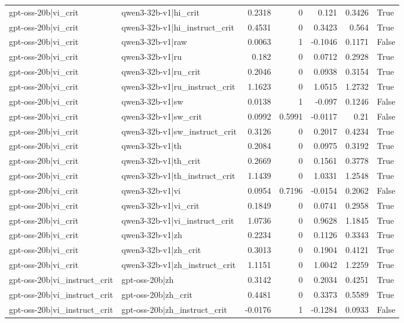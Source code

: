 \begin{table}
\begin{tabular}{l l r r r r l}
gpt-oss-20b|vi_crit & qwen3-32b-v1|hi_crit & 0.2318 & 0 & 0.121 & 0.3426 & True \\
gpt-oss-20b|vi_crit & qwen3-32b-v1|hi_instruct_crit & 0.4531 & 0 & 0.3423 & 0.564 & True \\
gpt-oss-20b|vi_crit & qwen3-32b-v1|raw & 0.0063 & 1 & -0.1046 & 0.1171 & False \\
gpt-oss-20b|vi_crit & qwen3-32b-v1|ru & 0.182 & 0 & 0.0712 & 0.2928 & True \\
gpt-oss-20b|vi_crit & qwen3-32b-v1|ru_crit & 0.2046 & 0 & 0.0938 & 0.3154 & True \\
gpt-oss-20b|vi_crit & qwen3-32b-v1|ru_instruct_crit & 1.1623 & 0 & 1.0515 & 1.2732 & True \\
gpt-oss-20b|vi_crit & qwen3-32b-v1|sw & 0.0138 & 1 & -0.097 & 0.1246 & False \\
gpt-oss-20b|vi_crit & qwen3-32b-v1|sw_crit & 0.0992 & 0.5991 & -0.0117 & 0.21 & False \\
gpt-oss-20b|vi_crit & qwen3-32b-v1|sw_instruct_crit & 0.3126 & 0 & 0.2017 & 0.4234 & True \\
gpt-oss-20b|vi_crit & qwen3-32b-v1|th & 0.2084 & 0 & 0.0975 & 0.3192 & True \\
gpt-oss-20b|vi_crit & qwen3-32b-v1|th_crit & 0.2669 & 0 & 0.1561 & 0.3778 & True \\
gpt-oss-20b|vi_crit & qwen3-32b-v1|th_instruct_crit & 1.1439 & 0 & 1.0331 & 1.2548 & True \\
gpt-oss-20b|vi_crit & qwen3-32b-v1|vi & 0.0954 & 0.7196 & -0.0154 & 0.2062 & False \\
gpt-oss-20b|vi_crit & qwen3-32b-v1|vi_crit & 0.1849 & 0 & 0.0741 & 0.2958 & True \\
gpt-oss-20b|vi_crit & qwen3-32b-v1|vi_instruct_crit & 1.0736 & 0 & 0.9628 & 1.1845 & True \\
gpt-oss-20b|vi_crit & qwen3-32b-v1|zh & 0.2234 & 0 & 0.1126 & 0.3343 & True \\
gpt-oss-20b|vi_crit & qwen3-32b-v1|zh_crit & 0.3013 & 0 & 0.1904 & 0.4121 & True \\
gpt-oss-20b|vi_crit & qwen3-32b-v1|zh_instruct_crit & 1.1151 & 0 & 1.0042 & 1.2259 & True \\
gpt-oss-20b|vi_instruct_crit & gpt-oss-20b|zh & 0.3142 & 0 & 0.2034 & 0.4251 & True \\
gpt-oss-20b|vi_instruct_crit & gpt-oss-20b|zh_crit & 0.4481 & 0 & 0.3373 & 0.5589 & True \\
gpt-oss-20b|vi_instruct_crit & gpt-oss-20b|zh_instruct_crit & -0.0176 & 1 & -0.1284 & 0.0933 & False \\

\end{tabular}
\end{table}
